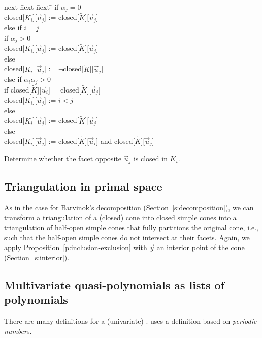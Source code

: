 \begin{algorithm}
\begin{tabbing}
next \= next \= next \= \kill
if $\alpha_j = 0$ \\
\> closed[$K_i$][$\vec u_j$] := closed[$\tilde K$][$\vec u_j$] \\
else if $i = j$ \\
\> if $\alpha_j > 0$ \\
\> \> closed[$K_i$][$\vec u_j$] := closed[$\tilde K$][$\vec u_j$] \\
\> else \\
\> \> closed[$K_i$][$\vec u_j$] := $\lnot$closed[$\tilde K$][$\vec u_j$] \\
else if $\alpha_i \alpha_j > 0$ \\
\> if closed[$\tilde K$][$\vec u_i$] = closed[$\tilde K$][$\vec u_j$] \\
\> \> closed[$K_i$][$\vec u_j$] := $i < j$ \\
\> else \\
\> \> closed[$K_i$][$\vec u_j$] := closed[$\tilde K$][$\vec u_j$] \\
else \\
\> closed[$K_i$][$\vec u_j$] := closed[$\tilde K$][$\vec u_i$] and
closed[$\tilde K$][$\vec u_j$]
\end{tabbing}
\caption{Determine whether the facet opposite $\vec u_j$ is closed in $K_i$.}
\label{alg:closed}
\end{algorithm}

\subsection{Triangulation in primal space}
\label{s:triangulation}

As in the case for Barvinok's decomposition (Section~\ref{s:decomposition}),
we can transform a triangulation of a (closed) cone into closed simple cones
into a triangulation of half-open simple cones that fully partitions the
original cone, i.e., such that the half-open simple cones do not intersect at their
facets.
Again, we apply Proposition~\ref{p:inclusion-exclusion} with $\vec y$
an interior point of the cone (Section~\ref{s:interior}).

\subsection{Multivariate quasi-polynomials as lists of polynomials}

There are many definitions for a (univariate) .
 uses a definition based on {\em periodic number}s.


